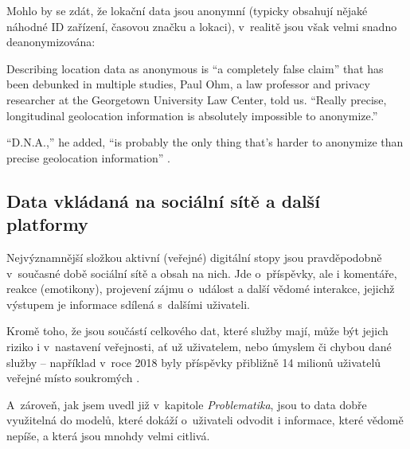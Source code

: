 Mohlo by se zdát, že lokační data jsou anonymní (typicky obsahují nějaké náhodné ID zařízení, časovou značku a lokaci), v~realitě jsou však velmi snadno deanonymizována:

\begin{displayquote}
Describing location data as anonymous is “a completely false claim” that has been debunked in multiple studies, Paul Ohm, a law professor and privacy researcher at the Georgetown University Law Center, told us. “Really precise, longitudinal geolocation information is absolutely impossible to anonymize.”

“D.N.A.,” he added, “is probably the only thing that’s harder to anonymize than precise geolocation information” \citep{location-data}.
\end{displayquote}

\subsection{Data vkládaná na sociální sítě a další platformy}
Nejvýznamnější složkou aktivní (veřejné) digitální stopy jsou pravděpodobně v~současné době sociální sítě a obsah na nich.
Jde o~příspěvky, ale i komentáře, reakce (emotikony), projevení zájmu o~událost a další vědomé interakce, jejichž výstupem je informace sdílená s~dalšími uživateli. 

Kromě toho, že jsou součástí celkového  dat, které služby mají, může být jejich riziko i v~nastavení veřejnosti, ať už uživatelem, nebo úmyslem či chybou dané služby -- například v~roce 2018 byly příspěvky přibližně 14 milionů uživatelů veřejné místo soukromých \citep{facebook-public-posts}.

A~zároveň, jak jsem uvedl již v~kapitole \textit{Problematika}, jsou to data dobře využitelná do modelů, které dokáží o~uživateli odvodit i informace, které vědomě nepíše, a která jsou mnohdy velmi citlivá.

